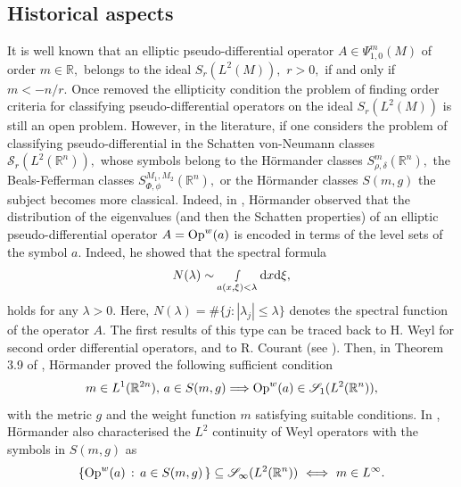 \documentclass[12pt, reqno]{amsart}
\theoremstyle{definition}
\theoremstyle{remark}
\numberwithin{equation}{section}
\begin{document}
\subsection{Historical aspects}
%
%
It is well known that an elliptic pseudo-differential operator $A\in \Psi^m_{1,0}(M)$  of order $m\in \mathbb{R},$  belongs to the ideal $S_{r}(L^2(M)),$ $r>0,$ if and only if $m<-n/r.$ Once removed the ellipticity condition the problem of finding  order criteria for classifying pseudo-differential operators on the ideal $S_{r}(L^2(M))$ is still an open problem. However, in the literature, if one considers the problem of classifying pseudo-differential in the Schatten von-Neumann classes $\mathscr{S}_{r}(L^2(\mathbb{R}^n)),$ whose symbols belong to the H\"ormander classes $S^{m}_{\rho,\delta}(\mathbb{R}^n),$ the Beals-Fefferman classes $S_{\Phi,\phi}^{M_1,M_2}(\mathbb{R}^n),$ or the H\"ormander classes $S(m,g)$  the subject becomes more classical. Indeed, in %
\cite{Hormander1979}, H\"ormander observed that the  distribution of the eigenvalues (and then the Schatten properties) of  an elliptic pseudo-differential operator $A=\textnormal{Op}^{w}(a)$ is  encoded in terms of the level sets of the symbol $a.$  Indeed, he showed that the spectral formula
\begin{equation*}
    N(\lambda)\sim \smallint_{a(x,\xi)<\lambda}\textnormal{d}x\textnormal{d}\xi,
\end{equation*}
holds for any $\lambda>0.$ Here, $N(\lambda)=\#\{j:|\lambda_j|\leq \lambda\}$ denotes the spectral function of the operator $A.$ The first results of this type can be traced back to H. Weyl for second order differential operators,
and to R. Courant (see \cite[Page 297]{Hormander1979}). Then, in Theorem 3.9 of  \cite{Hormander1979}, H\"ormander proved the following sufficient condition
\begin{equation}
    m\in L^1(\mathbb{R}^{2n}),\, a\in S(m,g)\Longrightarrow
    \textnormal{Op}^{w}(a) \in \mathscr{S}_{1}(L^2(\mathbb{R}^n)),
\end{equation}
with the metric $g$ and the weight function $m$ satisfying suitable conditions.
In \cite{Hormander1979B}, H{\"o}rmander also
characterised the $L^2$ continuity of Weyl operators
with the symbols in $S(m,g)$ as
\begin{equation}\label{Lp:Condition:RnCont}
\{ \textnormal{Op}^{w}(a) \, : \, a\in S(m,g)\, \} \subseteq
\mathscr{S}_{\infty}(L^2(\mathbb{R}^n))
\ \Longleftrightarrow \ 
m \in L^\infty .
\end{equation}
\end{document}

